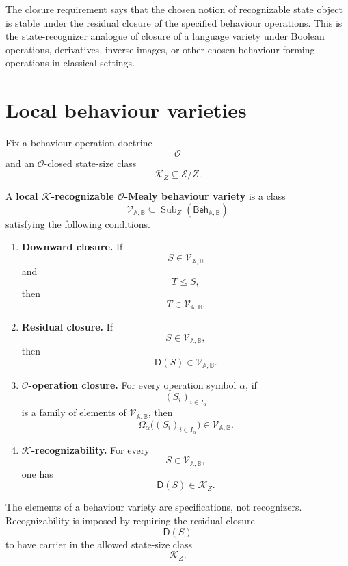 The closure requirement says that the chosen notion of recognizable state
object is stable under the residual closure of the specified behaviour
operations. This is the state-recognizer analogue of closure of a language
variety under Boolean operations, derivatives, inverse images, or other
chosen behaviour-forming operations in classical settings.

\section{Local behaviour varieties}
\label{sec:state-eilenberg-local-behaviour-varieties}

Fix a behaviour-operation doctrine
\[
\mathcal O
\]
and an \(\mathcal O\)-closed state-size class
\[
\mathcal K_Z\subseteq \mathcal E/Z.
\]

\begin{definition}
\label{def:state-eilenberg-local-behaviour-variety}
A \textbf{local \(\mathcal K\)-recognizable \(\mathcal O\)-Mealy behaviour
variety} is a class
\[
\mathcal V_{\mathbb A,\mathbb B}
\subseteq
\operatorname{Sub}_Z(\mathsf{Beh}_{\mathbb A,\mathbb B})
\]
satisfying the following conditions.

\begin{enumerate}
\item \textbf{Downward closure.} If
\[
S\in\mathcal V_{\mathbb A,\mathbb B}
\]
and
\[
T\leq S,
\]
then
\[
T\in\mathcal V_{\mathbb A,\mathbb B}.
\]

\item \textbf{Residual closure.} If
\[
S\in\mathcal V_{\mathbb A,\mathbb B},
\]
then
\[
\mathsf D(S)\in\mathcal V_{\mathbb A,\mathbb B}.
\]

\item \textbf{\(\mathcal O\)-operation closure.} For every operation symbol
\(\alpha\), if
\[
(S_i)_{i\in I_\alpha}
\]
is a family of elements of \(\mathcal V_{\mathbb A,\mathbb B}\), then
\[
\Omega_\alpha\bigl((S_i)_{i\in I_\alpha}\bigr)
\in
\mathcal V_{\mathbb A,\mathbb B}.
\]

\item \textbf{\(\mathcal K\)-recognizability.} For every
\[
S\in\mathcal V_{\mathbb A,\mathbb B},
\]
one has
\[
\mathsf D(S)\in\mathcal K_Z.
\]
\end{enumerate}
\end{definition}

The elements of a behaviour variety are specifications, not recognizers.
Recognizability is imposed by requiring the residual closure
\[
\mathsf D(S)
\]
to have carrier in the allowed state-size class
\[
\mathcal K_Z.
\]


